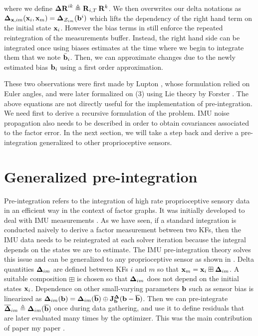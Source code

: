 %
where we define ${\bm \Delta {\bf R}}^{ik} \triangleq \prescript{}{}{{\bf R}}_{i,T} \prescript{}{}{{\bf R}}_{}^k$.
We then overwrites our delta notations as ${\bm \Delta}_{{\bf x},im}({\bf x}_i, {\bf x}_m) = {\bm \Delta}_{\mathcal{Z}_{im}}({\bf b}^i)$
which lifts the dependency of the right hand term on the initial state ${\bf x}_i$. However the bias terms in  still enforce the repeated 
reintegration of the measurements buffer. Instead, the right hand side can be integrated once using biases estimates at the time where we begin to integrate them that
we note $\bar{{\bf b}}_i$. Then, we can approximate changes due to the newly estimated bias ${\bf b}_i$ using a first order approximation.

These two observations were first made by Lupton \cite{lupton-09}, whose formulation relied on Euler angles, and were later formalized on \SO(3) using Lie theory
by Forster \cite{forster2017-TRO}. The above equations are not directly useful for the implementation of pre-integration. We need first to derive a recursive formulation 
of the problem. IMU noise propagation also needs to be described in order to obtain covariances associated to the factor error. In the next section, we will take 
a step back and derive a pre-integration generalized to other proprioceptive sensors.



\section{Generalized pre-integration}
\label{sec:general-preint}


Pre-integration refers to the integration of high rate proprioceptive sensory data in an efficient way in the context of factor graphs. 
It was initially developed to deal with IMU measurements \cite{lupton-09, forster2017-TRO}. 
As we have seen, if a standard integration is conducted naively to derive a factor measurement between two KFs, 
then the IMU data needs to be reintegrated at each solver iteration because the integral depends on the states we are to estimate. 
The IMU pre-integration theory solves this issue and can be generalized to any proprioceptive sensor as shown in \cite{atchuthan-18-thesis,deray-19-selfcalib,fourmy2021contact}. 
Delta quantities ${\bm \Delta}_{im}$  are defined between KFs $i$ and $m$ so that ${\bf x}_m={\bf x}_i\boxplus{\bm \Delta}_{im}$. A suitable composition $\boxplus$ is chosen so that ${\bm \Delta}_{im}$ 
does not depend on the initial states ${\bf x}_i$. 
Dependence on other small-varying parameters ${\bf b}$ such as sensor bias is linearized as ${\bm \Delta}_{im}({\bf b})={\bm \Delta}_{im}(\overline{{\bf b}})\oplus{\bf J}^{\bm \Delta}_{\bf b}({\bf b}-\overline{{\bf b}})$.
Then we can pre-integrate $\overline{{\bm \Delta}}_{im}\triangleq{\bm \Delta}_{im}(\overline{{\bf b}})$ once during data gathering, and use it to define residuals that are later evaluated many times by the optimizer.
This was the main contribution of paper my paper \cite{fourmy2021contact}.

